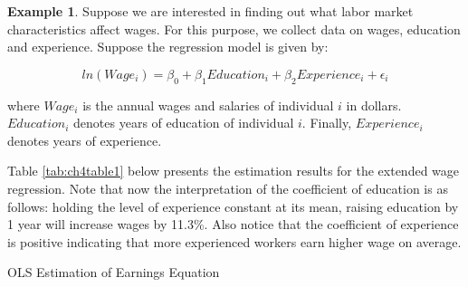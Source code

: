 \documentclass[
]{book}
\theoremstyle{definition}
\theoremstyle{definition}
\newtheorem{example}{Example}[chapter]
\theoremstyle{definition}
\theoremstyle{definition}
\theoremstyle{remark}
\begin{document}
\begin{example}
\protect\hypertarget{exm:unnamed-chunk-77}{}\label{exm:unnamed-chunk-77}Suppose we are interested in finding out what labor market characteristics affect wages. For this purpose, we collect data on wages, education and experience. Suppose the regression model is given by:

\[ln(Wage_i)= \beta_0 +\beta_1 Education_i + \beta_2 Experience_i + \epsilon_i\]

where \(Wage_i\) is the annual wages and salaries of individual \(i\) in dollars. \(Education_i\) denotes years of education of individual \(i\). Finally, \(Experience_i\) denotes years of experience.

Table \ref{tab:ch4table1} below presents the estimation results for the extended wage regression. Note that now the interpretation of the coefficient of education is as follows: holding the level of experience constant at its mean, raising education by 1 year will increase wages by 11.3\%. Also notice that the coefficient of experience is positive indicating that more experienced workers earn higher wage on average.
\end{example}

\label{tab:ch4table1} OLS Estimation of Earnings Equation
\end{document}
